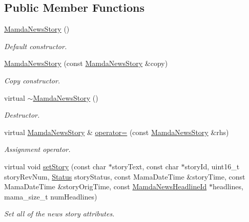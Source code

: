 \subsection*{Public Member Functions}
\begin{CompactItemize}
\item 
\hyperlink{classWombat_1_1MamdaNewsStory_4d1184df1fa59738caaeadab8e9baea5}{Mamda\-News\-Story} ()
\begin{CompactList}\small\item\em Default constructor. \item\end{CompactList}\item 
\hyperlink{classWombat_1_1MamdaNewsStory_769ee133b8f573427ae490bdeac61f50}{Mamda\-News\-Story} (const \hyperlink{classWombat_1_1MamdaNewsStory}{Mamda\-News\-Story} \&copy)
\begin{CompactList}\small\item\em Copy constructor. \item\end{CompactList}\item 
virtual \hyperlink{classWombat_1_1MamdaNewsStory_deac4e7b52a782e3589b3f31686d4f3f}{$\sim$Mamda\-News\-Story} ()
\begin{CompactList}\small\item\em Destructor. \item\end{CompactList}\item 
virtual \hyperlink{classWombat_1_1MamdaNewsStory}{Mamda\-News\-Story} \& \hyperlink{classWombat_1_1MamdaNewsStory_f344d607c50491850bc85b8673671801}{operator=} (const \hyperlink{classWombat_1_1MamdaNewsStory}{Mamda\-News\-Story} \&rhs)
\begin{CompactList}\small\item\em Assignment operator. \item\end{CompactList}\item 
virtual void \hyperlink{classWombat_1_1MamdaNewsStory_df49ed635f59590744796d30a05fc81a}{set\-Story} (const char $\ast$story\-Text, const char $\ast$story\-Id, uint16\_\-t story\-Rev\-Num, \hyperlink{classWombat_1_1MamdaNewsStory_25ee81ce6b01be03a95ab954acdb1e6d}{Status} story\-Status, const Mama\-Date\-Time \&story\-Time, const Mama\-Date\-Time \&story\-Orig\-Time, const \hyperlink{namespaceWombat_cb354a5fc91d5b728f8f1255aae3e196}{Mamda\-News\-Headline\-Id} $\ast$headlines, mama\_\-size\_\-t num\-Headlines)
\begin{CompactList}\small\item\em Set all of the news story attributes. \item\end{CompactList}\item 

\end{CompactItemize}
